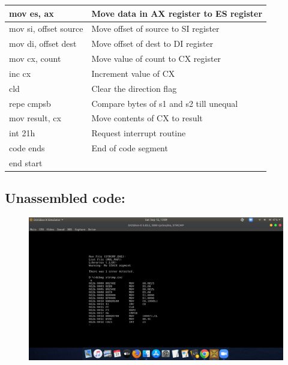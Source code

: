 \documentclass[12pt,a4paper]{article}
\begin{document}
\begin{flushleft}
\begin{table}[htb]
{\begin{tabular}{|l|l|}
\hline
mov es, ax                                                       & Move data in AX register to ES register       \\ 
\hline
mov si, offset source                                            & Move offset of source to SI register          \\ 
\hline
mov di, offset dest                                              & Move offset of dest to DI register            \\ 
\hline
mov cx, count                                                    & Move value of count to CX register            \\ 
\hline
inc cx                                                           & Increment value of CX                         \\
\hline
cld                                                              & Clear the direction flag                      \\
\hline
repe cmpsb                                                       & Compare bytes of s1 and s2 till unequal       \\
\hline
mov result, cx                                                   & Move contents of CX to result                 \\
\hline
int 21h                                                          & Request interrupt routine                     \\ 
\hline
code ends                                                        & End of code segment                           \\
\hline
end start                                                        &                                               \\
\hline
\end{tabular}
}
\end{table}

\newpage
\subsection*{\textbf{Unassembled code:}}
\begin{figure}[h]
    \centering
    \includegraphics[trim = 100mm 60mm 200mm 120mm, clip, width = \textwidth]{Pics/StrcmpUS.png}
\end{figure}

\end{flushleft}
\end{document}
